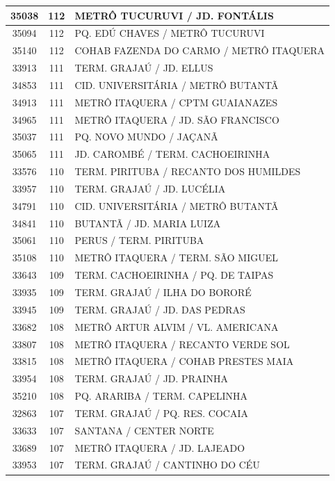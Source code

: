 \documentclass[
	12pt,				%
	oneside,			%
	a4paper,			%
	english,			%
	brazil				%
	]{abntex2ppgsi}
\begin{document}
{{{\begin{apendicesenv}
\begin{longtable}{c|c|p{7cm}}
 \hline 
35038 &	112 &	METRÔ TUCURUVI / JD. FONTÁLIS \\ 
 \hline 
35094 &	112 &	PQ. EDÚ CHAVES / METRÔ TUCURUVI \\ 
 \hline 
35140 &	112 &	COHAB FAZENDA DO CARMO / METRÔ ITAQUERA \\ 
 \hline 
33913 &	111 &	TERM. GRAJAÚ / JD. ELLUS \\ 
 \hline 
34853 &	111 &	CID. UNIVERSITÁRIA / METRÔ BUTANTÃ \\ 
 \hline 
34913 &	111 &	METRÔ ITAQUERA / CPTM GUAIANAZES \\ 
 \hline 
34965 &	111 &	METRÔ ITAQUERA / JD. SÃO FRANCISCO \\ 
 \hline 
35037 &	111 &	PQ. NOVO MUNDO / JAÇANÃ \\ 
 \hline 
35065 &	111 &	JD. CAROMBÉ / TERM. CACHOEIRINHA \\ 
 \hline 
33576 &	110 &	TERM. PIRITUBA / RECANTO DOS HUMILDES \\ 
 \hline 
33957 &	110 &	TERM. GRAJAÚ / JD. LUCÉLIA \\ 
 \hline 
34791 &	110 &	CID. UNIVERSITÁRIA / METRÔ BUTANTÃ \\ 
 \hline 
34841 &	110 &	BUTANTÃ / JD. MARIA LUIZA \\ 
 \hline 
35061 &	110 &	PERUS / TERM. PIRITUBA \\ 
 \hline 
35108 &	110 &	METRÔ ITAQUERA / TERM. SÃO MIGUEL \\ 
 \hline 
33643 &	109 &	TERM. CACHOEIRINHA / PQ. DE TAIPAS \\ 
 \hline 
33935 &	109 &	TERM. GRAJAÚ / ILHA DO BORORÉ \\ 
 \hline 
33945 &	109 &	TERM. GRAJAÚ / JD. DAS PEDRAS \\ 
 \hline 
33682 &	108 &	METRÔ ARTUR ALVIM / VL. AMERICANA \\ 
 \hline 
33807 &	108 &	METRÔ ITAQUERA / RECANTO VERDE SOL \\ 
 \hline 
33815 &	108 &	METRÔ ITAQUERA / COHAB PRESTES MAIA \\ 
 \hline 
33954 &	108 &	TERM. GRAJAÚ / JD. PRAINHA \\ 
 \hline 
35210 &	108 &	PQ. ARARIBA / TERM. CAPELINHA \\ 
 \hline 
32863 &	107 &	TERM. GRAJAÚ / PQ. RES. COCAIA \\ 
 \hline 
33633 &	107 &	SANTANA / CENTER NORTE \\ 
 \hline 
33689 &	107 &	METRÔ ITAQUERA / JD. LAJEADO \\ 
 \hline 
33953 &	107 &	TERM. GRAJAÚ / CANTINHO DO CÉU \\ 

\end{longtable}
\end{apendicesenv}}}}
\end{document}
